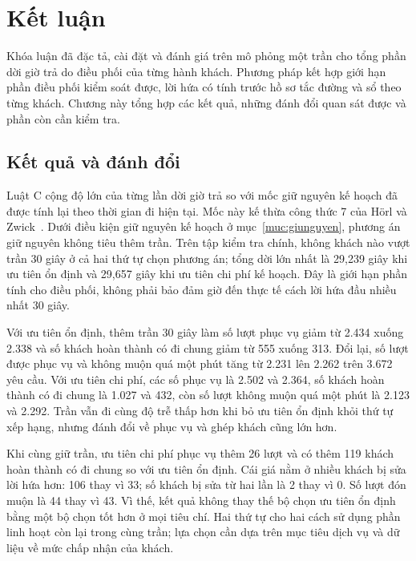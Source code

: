 \chapter{Kết luận}
\label{chuong:ketluan}

Khóa luận đã đặc tả, cài đặt và đánh giá trên mô phỏng một trần cho tổng phần dời giờ trả do điều phối của từng
hành khách. Phương pháp kết hợp giới hạn phần điều phối kiểm soát được, lời hứa có tính trước hồ sơ tắc đường
và sổ theo từng khách. Chương này tổng hợp các kết quả, những đánh đổi quan sát được và phần còn cần kiểm tra.

\section{Kết quả và đánh đổi}
\label{muc:c5-tongket}

Luật C cộng độ lớn của từng lần dời giờ trả so với mốc giữ nguyên kế hoạch đã được tính lại theo thời gian đi
hiện tại. Mốc này kế thừa công thức 7 của Hörl và Zwick~\cite{horl2022}. Dưới điều kiện giữ nguyên kế hoạch ở
mục~\ref{muc:giunguyen}, phương án giữ nguyên không tiêu thêm trần. Trên tập kiểm tra chính, không khách nào
vượt trần 30 giây ở cả hai thứ tự chọn phương án; tổng dời lớn nhất là 29,239 giây khi ưu tiên ổn định và
29,657 giây khi ưu tiên chi phí kế hoạch. Đây là giới hạn phần tính cho điều phối, không phải bảo đảm giờ đến
thực tế cách lời hứa đầu nhiều nhất 30 giây.

Với ưu tiên ổn định, thêm trần 30 giây làm số lượt phục vụ giảm từ 2.434 xuống 2.338 và số khách hoàn thành
có đi chung giảm từ 555 xuống 313. Đổi lại, số lượt được phục vụ và không muộn quá một phút tăng từ 2.231
lên 2.262 trên 3.672 yêu cầu. Với ưu tiên chi phí, các số phục vụ là 2.502 và 2.364, số khách hoàn thành có
đi chung là 1.027 và 432, còn số lượt không muộn quá một phút là 2.123 và 2.292. Trần vẫn đi cùng độ trễ
thấp hơn khi bỏ ưu tiên ổn định khỏi thứ tự xếp hạng, nhưng đánh đổi về phục vụ và ghép khách cũng lớn hơn.

Khi cùng giữ trần, ưu tiên chi phí phục vụ thêm 26 lượt và có thêm 119 khách hoàn thành có đi chung so với
ưu tiên ổn định. Cái giá nằm ở nhiều khách bị sửa lời hứa hơn: 106 thay vì 33; số khách bị sửa từ hai lần
là 2 thay vì 0. Số lượt đón muộn là 44 thay vì 43. Vì thế, kết quả không thay thế bộ chọn ưu tiên ổn định
bằng một bộ chọn tốt hơn ở mọi tiêu chí. Hai thứ tự cho hai cách sử dụng phần linh hoạt còn lại trong cùng
trần; lựa chọn cần dựa trên mục tiêu dịch vụ và dữ liệu về mức chấp nhận của khách.

